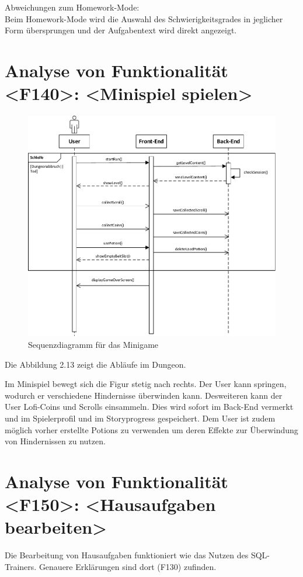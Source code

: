 Abweichungen zum Homework-Mode:\\
Beim Homework-Mode wird die Auswahl des Schwierigkeitsgrades in jeglicher Form übersprungen und der Aufgabentext wird direkt angezeigt.  

\newpage
\section{Analyse von Funktionalität <F140>: <Minispiel spielen>}
\begin{figure}[h]
\centering
\includegraphics[width=1.3\textwidth]{figures/sequenz_F140.pdf}
\caption{Sequenzdiagramm für das Minigame}
\label{sequence}
\end{figure}
Die Abbildung 2.13 zeigt die Abläufe im Dungeon.

Im Minispiel bewegt sich die Figur stetig nach rechts. Der User kann springen, wodurch er verschiedene Hindernisse überwinden kann. Desweiteren kann der User Lofi-Coins und Scrolls einsammeln. Dies wird sofort im Back-End vermerkt und im Spielerprofil und im Storyprogress gespeichert. Dem User ist zudem möglich vorher erstellte Potions zu verwenden um deren Effekte zur Überwindung von Hindernissen zu nutzen.


\section{Analyse von Funktionalität <F150>: <Hausaufgaben bearbeiten>}
Die Bearbeitung von Hausaufgaben funktioniert wie das Nutzen des SQL-Trainers. Genauere Erklärungen sind dort (F130) zufinden.

